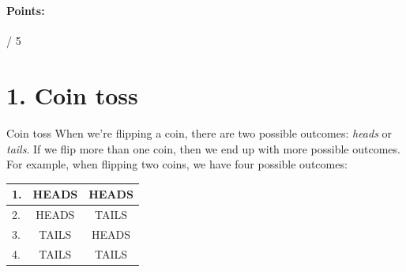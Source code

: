 \documentclass[a4paper,12pt]{book}
\begin{document}
    ~\\

    \paragraph{Points:} \fitb / 5
    
    \hrulefill{}
    
    \newpage{}


    \section*{1. Coin toss}

        \begin{intro}{Coin toss}
            When we're flipping a coin, there are two possible outcomes:
            \textit{heads} or \textit{tails}. If we flip more than one
            coin, then we end up with more possible outcomes. For example,
            when flipping two coins, we have four possible outcomes:

            \begin{center}
                \begin{tabular}{ | l | c | c | }
                    \hline
                    1. & HEADS & HEADS \\ \hline
                    2. & HEADS & TAILS \\ \hline
                    3. & TAILS & HEADS \\ \hline
                    4. & TAILS & TAILS \\ \hline
                \end{tabular}
            \end{center}
        \end{intro}
\end{document}
